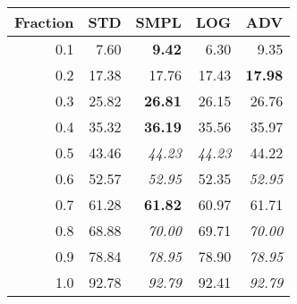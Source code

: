 \documentclass{standalone}
\begin{document}
\begin{tabular}{r|rrrr}
      \toprule
      Fraction & STD & SMPL & LOG & ADV\\
      \midrule
      0.1 & 7.60 & \textbf{9.42} & 6.30 & 9.35\\
  0.2 & 17.38 & 17.76 & 17.43 & \textbf{17.98}\\
  0.3 & 25.82 & \textbf{26.81} & 26.15 & 26.76\\
  0.4 & 35.32 & \textbf{36.19} & 35.56 & 35.97\\
  0.5 & 43.46 & \emph{44.23} & \emph{44.23} & 44.22\\
  0.6 & 52.57 & \emph{52.95} & 52.35 & \emph{52.95}\\
  0.7 & 61.28 & \textbf{61.82} & 60.97 & 61.71\\
  0.8 & 68.88 & \emph{70.00} & 69.71 & \emph{70.00}\\
  0.9 & 78.84 & \emph{78.95} & 78.90 & \emph{78.95}\\
  1.0 & 92.78 & \emph{92.79} & 92.41 & \emph{92.79}\\
  \bottomrule
\end{tabular}
\end{document}
